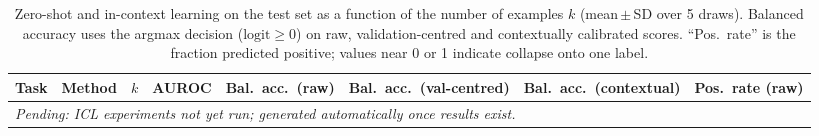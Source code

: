 \begin{table}[t]
\centering
\scriptsize
\caption{Zero-shot and in-context learning on the test set as a function of the number of examples $k$ (mean\,$\pm$\,SD over 5 draws). Balanced accuracy uses the argmax decision ($\text{logit}\geq0$) on raw, validation-centred and contextually calibrated scores. ``Pos.\ rate'' is the fraction predicted positive; values near 0 or 1 indicate collapse onto one label.}
\label{tab:icl}
\begin{tabular}{clcccccc}
\toprule
Task & Method & $k$ & AUROC & Bal.\ acc.\ (raw) & Bal.\ acc.\ (val-centred) & Bal.\ acc.\ (contextual) & Pos.\ rate (raw)\\
\midrule
\multicolumn{8}{l}{\textit{Pending: ICL experiments not yet run; generated automatically once results exist.}}\\
\bottomrule
\end{tabular}
\end{table}
